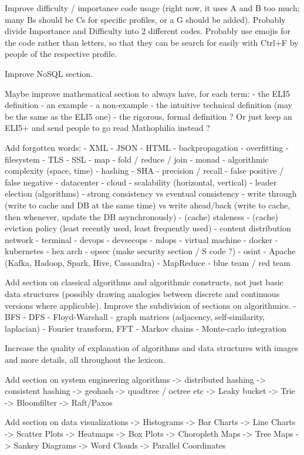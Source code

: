 \documentclass{article}
\begin{document}
Improve difficulty / importance code usage (right now, it uses A and B too much; many Bs should be Cs for specific profiles, or a G should be added). Probably divide Importance and Difficulty into 2 different codes. Probably use emojis for the code rather than letters, so that they can be search for easily with Ctrl+F by people of the respective profile.

Improve NoSQL section.

Maybe improve mathematical section to always have, for each term:
- the ELI5 definition
- an example
- a non-example
- the intuitive technical definition (may be the same as the ELI5 one)
- the rigorous, formal definition
? Or just keep an ELI5+ and send people to go read Mathophilia instead ?

Add forgotten words:
- XML
- JSON
- HTML
- backpropagation
- overfitting
- filesystem
- TLS
- SSL
- map
- fold / reduce / join
- monad
- algorithmic complexity (space, time)
- hashing
- SHA
- precision / recall
- false positive / false negative
- datacenter
- cloud
- scalability (horizontal, vertical)
- leader election (algorithms)
- strong consistency vs eventual consistency
- write through (write to cache and DB at the same time) vs write ahead/back (write to cache, then whenever, update the DB asynchronously)
- (cache) staleness
- (cache) eviction policy (least recently used, least frequently used)
- content distribution network
- terminal
- devops
- devsecops
- mlops
- virtual machine
- docker
- kubernetes
- hex arch
- opsec (make security section / S code ?) 
- osint
- Apache (Kafka, Hadoop, Spark, Hive, Cassandra)
- MapReduce
- blue team / red team



Add section on classical algorithms and algorithmic constructs, not just basic data structures (possibly drawing analogies between discrete and continuous versions where applicable). Improve the subdivision of sections on algorithmics.
- BFS
- DFS
- Floyd-Warshall
- graph matrices (adjacency, self-similarity, laplacian)
- Fourier transform, FFT
- Markov chains
- Monte-carlo integration

Increase the quality of explanation of algorithms and data structures with images and more details, all throughout the lexicon.

Add section on system engineering algorithms
-> distributed hashing
-> consistent hashing
-> geohash
-> quadtree / octree etc
-> Leaky bucket
-> Trie
-> Bloomfilter
-> Raft/Paxos

Add section on data visualizations
-> Histograms
-> Bar Charts
-> Line Charts
-> Scatter Plots
-> Heatmaps
-> Box Plots
-> Choropleth Maps
-> Tree Maps
-> Sankey Diagrams
-> Word Clouds
-> Parallel Coordinates
\end{document}
